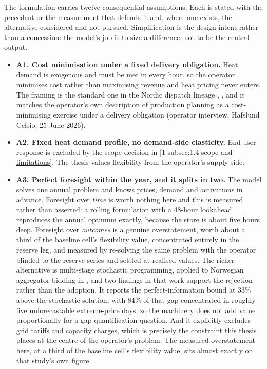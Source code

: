 The formulation carries twelve consequential assumptions. Each is stated with the precedent or the measurement that defends it and, where one exists, the alternative considered and not pursued. Simplification is the design intent rather than a concession: the model's job is to size a difference, not to be the central output.

\begin{itemize}
    \item \textbf{A1. Cost minimisation under a fixed delivery obligation.} Heat demand is exogenous and must be met in every hour, so the operator minimises cost rather than maximising revenue and heat pricing never enters. The framing is the standard one in the Nordic dispatch lineage \cite{kirkerud_impacts_2016}, \cite{tromborg_flexible_2017}, and it matches the operator's own description of production planning as a cost-minimising exercise under a delivery obligation (operator interview, Hafslund Celsio, 25 June 2026).

    \item \textbf{A2. Fixed heat demand profile, no demand-side elasticity.} End-user response is excluded by the scope decision in \autoref{1-subsec:1.4 scope and limitations}. The thesis values flexibility from the operator's supply side.

    \item \textbf{A3. Perfect foresight within the year, and it splits in two.} The model solves one annual problem and knows prices, demand and activations in advance. Foresight over \emph{time} is worth nothing here and this is measured rather than asserted: a rolling formulation with a 48-hour lookahead reproduces the annual optimum exactly, because the store is about five hours deep. Foresight over \emph{outcomes} is a genuine overstatement, worth about a third of the baseline cell's flexibility value, concentrated entirely in the reserve leg, and measured by re-solving the same problem with the operator blinded to the reserve series and settled at realised values. The richer alternative is multi-stage stochastic programming, applied to Norwegian aggregator bidding in \cite{ottesen_multi_2018}, and two findings in that work support the rejection rather than the adoption. It reports the perfect-information bound at $33\%$ above the stochastic solution, with $84\%$ of that gap concentrated in roughly five unforecastable extreme-price days, so the machinery does not add value proportionally for a gap-quantification question. And it explicitly excludes grid tariffs and capacity charges, which is precisely the constraint this thesis places at the centre of the operator's problem. The measured overstatement here, at a third of the baseline cell's flexibility value, sits almost exactly on that study's own figure.


\end{itemize}
